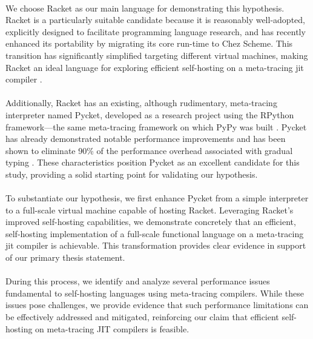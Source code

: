         \paragraph{}%
            We choose Racket as our main language for demonstrating this hypothesis. Racket is a particularly suitable candidate because it is reasonably well-adopted, explicitly designed to facilitate programming language research, and has recently enhanced its portability by migrating its core run-time to Chez Scheme. This transition has significantly simplified targeting different virtual machines, making Racket an ideal language for exploring efficient self-hosting on a meta-tracing \gls{jit} compiler \cite{icfp2019}.

        \paragraph{}%
            Additionally, Racket has an existing, although rudimentary, meta-tracing interpreter named Pycket, developed as a research project using the RPython framework—the same meta-tracing framework on which PyPy was built \cite{bolzPhDThesis,bolzMetatracingMakesFast2014}. Pycket has already demonstrated notable performance improvements and has been shown to eliminate 90\% of the performance overhead associated with gradual typing \cite{pycketmain,pycketmain2}. These characteristics position Pycket as an excellent candidate for this study, providing a solid starting point for validating our hypothesis.

        \paragraph{}%
            To substantiate our hypothesis, we first enhance Pycket from a simple interpreter to a full-scale virtual machine capable of hosting Racket. Leveraging Racket's improved self-hosting capabilities, we demonstrate concretely that an efficient, self-hosting implementation of a full-scale functional language on a meta-tracing \gls{jit} compiler is achievable. This transformation provides clear evidence in support of our primary thesis statement.

        \paragraph{}%
            During this process, we identify and analyze several performance issues fundamental to self-hosting languages using meta-tracing compilers. While these issues pose challenges, we provide evidence that such performance limitations can be effectively addressed and mitigated, reinforcing our claim that efficient self-hosting on meta-tracing JIT compilers is feasible.

